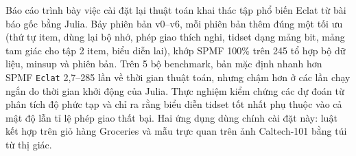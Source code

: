 Báo cáo trình bày việc cài đặt lại thuật toán khai thác tập phổ biến Eclat từ bài báo gốc bằng Julia. Bảy phiên bản v0--v6, mỗi phiên bản thêm đúng một tối ưu (thứ tự item, dùng lại bộ nhớ, phép giao thích nghi, tidset dạng mảng bit, mảng tam giác cho tập 2 item, biểu diễn lai), khớp SPMF 100\% trên 245 tổ hợp bộ dữ liệu, minsup và phiên bản. Trên 5 bộ benchmark, bản mặc định nhanh hơn SPMF \texttt{Eclat} 2,7--285 lần về thời gian thuật toán, nhưng chậm hơn ở các lần chạy ngắn do thời gian khởi động của Julia. Thực nghiệm kiểm chứng các dự đoán từ phân tích độ phức tạp và chỉ ra rằng biểu diễn tidset tốt nhất phụ thuộc vào cả mật độ lẫn tỉ lệ phép giao thất bại. Hai ứng dụng dùng chính cài đặt này: luật kết hợp trên giỏ hàng Groceries và mẫu trực quan trên ảnh Caltech-101 bằng túi từ thị giác.
